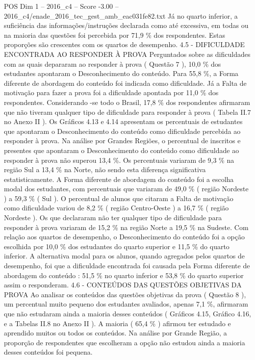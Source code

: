 \begin{textsample}{POS Dim 1 – 2016\_c4 – Score -3.00 – 2016\_c4/enade\_2016\_tec\_gest\_amb\_eac031fe82.txt}
Já no quarto inferior, a suficiência das informações/instruções declarada como até excessiva, em todas ou na maioria das questões foi percebida por 71,9 \% dos respondentes.
Estas proporções são crescentes com os quartos de desempenho. 4.5 - DIFICULDADE ENCONTRADA AO RESPONDER À PROVA Perguntados sobre as dificuldades com as quais depararam ao responder à prova ( Questão 7 ), 10,0 \% dos estudantes apontaram o Desconhecimento do conteúdo.
Para 55,8 \%, a Forma diferente de abordagem do conteúdo foi indicada como dificuldade.
Já a Falta de motivação para fazer a prova foi a dificuldade apontada por 11,0 \% dos respondentes.
Considerando -se todo o Brasil, 17,8 \% dos respondentes afirmaram que não tiveram qualquer tipo de dificuldade para responder à prova ( Tabela II.7 no Anexo II ).
Os Gráficos 4.13 e 4.14 apresentam os percentuais de estudantes que apontaram o Desconhecimento do conteúdo como dificuldade percebida ao responder à prova.
Na análise por Grandes Regiões, o percentual de inscritos e presentes que apontaram o Desconhecimento do conteúdo como dificuldade ao responder à prova não superou 13,4 \%.
Os percentuais variaram de 9,3 \% na região Sul a 13,4 \% na Norte, não sendo esta diferença significativa estatisticamente.
A Forma diferente de abordagem do conteúdo foi a escolha modal dos estudantes, com percentuais que variaram de 49,0 \% ( região Nordeste ) a 59,3 \% ( Sul ).
O percentual de alunos que citaram a Falta de motivação como dificuldade variou de 8,2 \% ( região Centro-Oeste ) a 16,7 \% ( região Nordeste ).
Os que declararam não ter qualquer tipo de dificuldade para responder à prova variaram de 15,2 \% na região Norte a 19,5 \% na Sudeste.
Com relação aos quartos de desempenho, o Desconhecimento do conteúdo foi a opção escolhida por 10,0 \% dos estudantes do quarto superior e 11,5 \% do quarto inferior.
A alternativa modal para os alunos, quando agregados pelos quartos de desempenho, foi que a dificuldade encontrada foi causada pela Forma diferente de abordagem do conteúdo : 51,5 \% no quarto inferior e 53,8 \% do quarto superior assim o responderam. 4.6 - CONTEÚDOS DAS QUESTÕES OBJETIVAS DA PROVA Ao analisar os conteúdos das questões objetivas da prova ( Questão 8 ), um percentual muito pequeno dos estudantes avaliados, apenas 7,1 \%, afirmaram que não estudaram ainda a maioria desses conteúdos ( Gráficos 4.15, Gráfico 4.16, e a Tabelas II.8 no Anexo II ).
A maioria ( 65,4 \% ) afirmou ter estudado e aprendido muitos ou todos os conteúdos.
Na análise por Grande Região, a proporção de respondentes que escolheram a opção não estudou ainda a maioria desses conteúdos foi pequena.

\end{textsample}
